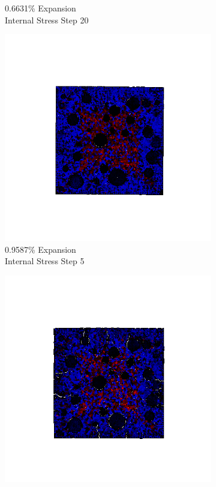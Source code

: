 \begin{figure}[ht!]
\begin{subfigure}{.25\textwidth}
      \caption{0.6631\% Expansion\\Internal Stress Step 20}
    \end{subfigure}
    
    \begin{subfigure}{.25\textwidth}
      \centering
      \includegraphics[width=1.0\linewidth]{Files/exp_3D/DEF/A15X0C_4_s5.png}
      \caption{0.9587\% Expansion\\Internal Stress Step 5}
    \end{subfigure}%
    \begin{subfigure}{.25\textwidth}
      \centering
      \includegraphics[width=1.0\linewidth]{Files/exp_3D/DEF/A15X0C_4_s10.png}

\end{subfigure}
\end{figure}
